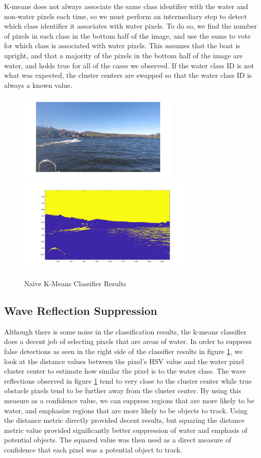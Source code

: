 \documentclass{article}
\begin{document}
K-means does not always associate the same class identifier with the water and
non-water pixels each time, so we must perform an intermediary step to detect
which class identifier it associates with water pixels.  To do so, we find the
number of pixels in each class in the bottom half of the image, and use the sums
to vote for which class is associated with water pixels. This assumes that the
boat is upright, and that a majority of the pixels in the bottom half of the
image are water, and holds true for all of the cases we observed.  If the water
class ID is not what was expected, the cluster centers are swapped so that the
water class ID is always a known value.

\begin{figure}
\includegraphics[width=7.8cm]{hsv_kmeans2_orig}
\includegraphics[width=8.5cm]{hsv_kmeans2_result}
\centering
\caption{Na\"ive K-Means Classifier Results}
\label{fig:kmeans}
\end{figure}

\subsection{Wave Reflection Suppression}
Although there is some noise in the classification results, the k-means
classifier does a decent job of selecting pixels that are areas of water. In
order to suppress false detections as seen in the right side of the classifier
results in figure \ref{fig:kmeans}, we look at the distance values between the
pixel's HSV value and the water pixel cluster center to estimate how similar the
pixel is to the water class.  The wave reflections observed in figure
\ref{fig:kmeans} tend to very close to the cluster center while true obstacle
pixels tend to be further away from the cluster center.  By using this measure
as a confidence value, we can suppress regions that are more likely to be water,
and emphasize regions that are more likely to be objects to track.  Using the
distance metric directly provided decent results, but squaring the distance
metric value provided significantly better suppression of water and emphasis of
potential objects.  The squared value was then used as a direct measure of
confidence that each pixel was a potential object to track.
\end{document}
